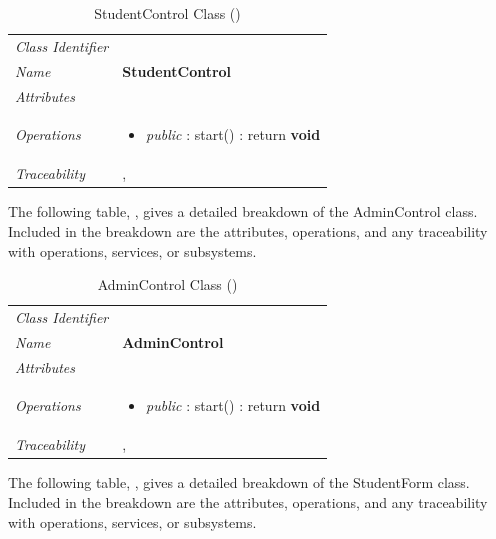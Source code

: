 \documentclass[12pt,letterpaper]{article}
\begin{document}
\begin{table}[H]
    \caption{StudentControl Class ()} 
	\begin{tabu} to 
		\toprule
		Class Identifier &  \\
		Name & {\bf StudentControl} \\
		Attributes & \\

		Operations &
		\begin{minipage}[t]{\linewidth}
			\begin{itemize}
			    \item {\it public} : start() : return {\bf void}
	        \end{itemize}
	    \end{minipage} \\
	    	Traceability & , \\
		\toprule
	\end{tabu}
\end{table}

The following table, , gives a detailed breakdown of the AdminControl class. Included in the breakdown are the attributes, operations, and any traceability with operations, services, or subsystems.

\begin{table}[H]
    \caption{AdminControl Class ()} 
	\begin{tabu} to 
		\toprule
		Class Identifier &  \\
		Name & {\bf AdminControl} \\
		Attributes & \\

		Operations &
		\begin{minipage}[t]{\linewidth}
			\begin{itemize}
			    \item {\it public} : start() : return {\bf void}
	        \end{itemize}
	    \end{minipage} \\
	    	Traceability & , \\
		\toprule
	\end{tabu}
\end{table}

The following table, , gives a detailed breakdown of the StudentForm class. Included in the breakdown are the attributes, operations, and any traceability with operations, services, or subsystems.
\end{document}
